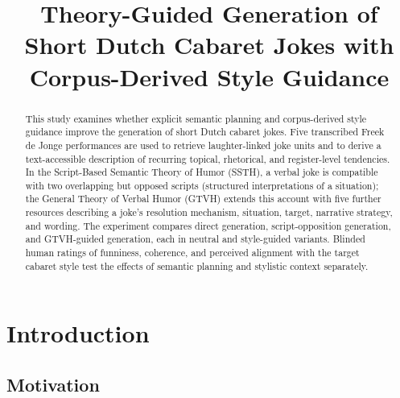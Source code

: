 \documentclass[11pt]{article}
\title{Theory-Guided Generation of Short Dutch Cabaret Jokes with Corpus-Derived Style Guidance}
\author{}
\begin{document}
\maketitle
\begin{abstract}

This study examines whether explicit semantic planning and corpus-derived style guidance improve the generation of short Dutch cabaret jokes. Five transcribed Freek de Jonge performances are used to retrieve laughter-linked joke units and to derive a text-accessible description of recurring topical, rhetorical, and register-level tendencies. In the Script-Based Semantic Theory of Humor (SSTH), a verbal joke is compatible with two overlapping but opposed scripts (structured interpretations of a situation); the General Theory of Verbal Humor (GTVH) extends this account with five further resources describing a joke's resolution mechanism, situation, target, narrative strategy, and wording. The experiment compares direct generation, script-opposition generation, and GTVH-guided generation, each in neutral and style-guided variants. Blinded human ratings of funniness, coherence, and perceived alignment with the target cabaret style test the effects of semantic planning and stylistic context separately.

\end{abstract}

\section{Introduction}

\subsection{Motivation}\label{motivation}
\end{document}
